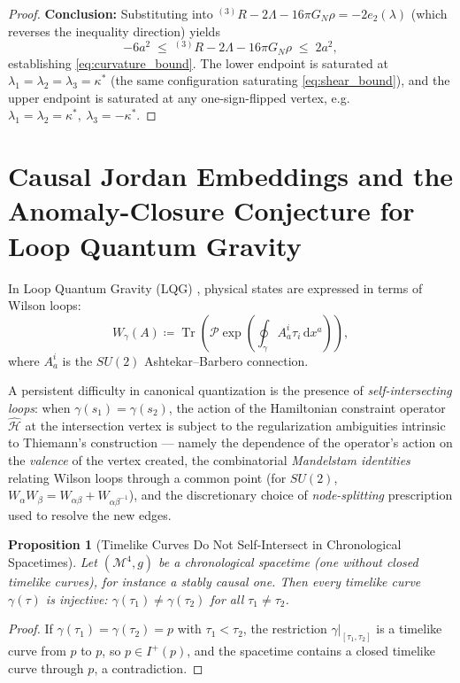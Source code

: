 \documentclass[11pt,a4paper,reqno]{amsart}
\newtheorem{proposition}[theorem]{Proposition}
\theoremstyle{definition}
\numberwithin{equation}{section}
\newcommand{\Tr}{\operatorname{Tr}}
\newcommand{\dif}{\,\mathrm{d}}
\begin{document}
\begin{proof}
\textbf{Conclusion:} Substituting into ${}^{(3)}R - 2\Lambda - 16\pi G_N\rho = -2e_2(\lambda)$ (which reverses the inequality direction) yields
\begin{equation}
    -6a^2 \;\le\; {}^{(3)}R - 2\Lambda - 16\pi G_N\rho \;\le\; 2a^2,
\end{equation}
establishing \eqref{eq:curvature_bound}. The lower endpoint is saturated at $\lambda_1=\lambda_2=\lambda_3=\kappa^*$ (the same configuration saturating \eqref{eq:shear_bound}), and the upper endpoint is saturated at any one-sign-flipped vertex, e.g.\ $\lambda_1=\lambda_2=\kappa^*,\ \lambda_3=-\kappa^*$.
\end{proof}

\section{Causal Jordan Embeddings and the Anomaly-Closure Conjecture for Loop Quantum Gravity}
\label{sec:jordan_lqg}

In Loop Quantum Gravity (LQG) \cite{ashtekar2004background}, physical states are expressed in terms of Wilson loops:
\begin{equation}
    \label{eq:wilson_loop_operator}
    W_\gamma(A) \coloneqq \Tr\left( \mathcal{P} \exp\left( \oint_\gamma A_a^i \tau_i \dif x^a \right) \right),
\end{equation}
where $A_a^i$ is the $SU(2)$ Ashtekar--Barbero connection.

A persistent difficulty in canonical quantization is the presence of \emph{self-intersecting loops}: when $\gamma(s_1) = \gamma(s_2)$, the action of the Hamiltonian constraint operator $\widehat{\mathcal{H}}$ at the intersection vertex is subject to the regularization ambiguities intrinsic to Thiemann's construction --- namely the dependence of the operator's action on the \emph{valence} of the vertex created, the combinatorial \emph{Mandelstam identities} relating Wilson loops through a common point (for $SU(2)$, $W_{\alpha} W_{\beta} = W_{\alpha\beta} + W_{\alpha\beta^{-1}}$), and the discretionary choice of \emph{node-splitting} prescription used to resolve the new edges.

\begin{proposition}[Timelike Curves Do Not Self-Intersect in Chronological Spacetimes]
\label{thm:jordan_chronology}
Let $(\mathcal{M}^4, g)$ be a chronological spacetime (one without closed timelike curves), for instance a stably causal one. Then every timelike curve $\gamma(\tau)$ is injective: $\gamma(\tau_1) \neq \gamma(\tau_2)$ for all $\tau_1 \neq \tau_2$.
\end{proposition}
\begin{proof}
If $\gamma(\tau_1) = \gamma(\tau_2) = p$ with $\tau_1 < \tau_2$, the restriction $\gamma|_{[\tau_1, \tau_2]}$ is a timelike curve from $p$ to $p$, so $p \in I^+(p)$, and the spacetime contains a closed timelike curve through $p$, a contradiction.
\end{proof}
\end{document}

